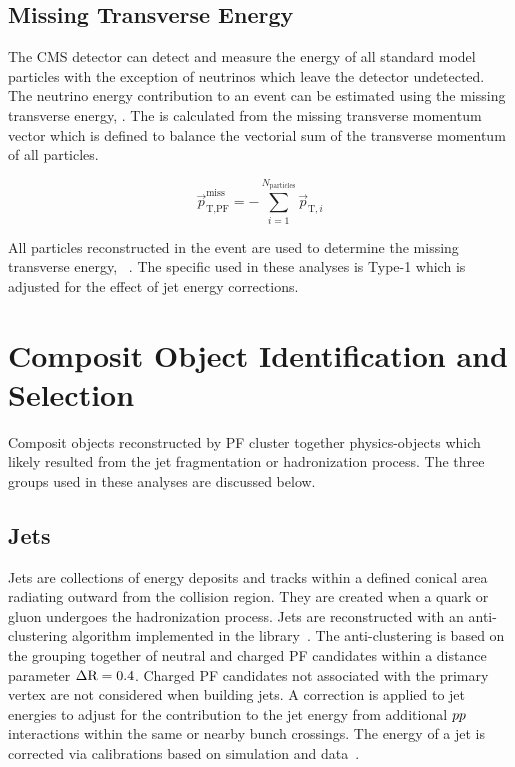 \subsection{Missing Transverse Energy}
The CMS detector can detect and measure the energy of all standard model particles with the exception
of neutrinos which leave the detector undetected. The neutrino energy contribution to an event can
be estimated using the missing transverse energy, \etvecmiss. The \etvecmiss is calculated from
the missing transverse momentum vector which is defined 
to balance the vectorial sum of the transverse momentum of all particles.

\begin{equation}
\vec{p}^{\text{miss}}_{\text{T,PF}} = - \sum^{N_{\text{particles}}}_{i=1} \vec{p}_{\text{T},i}
\end{equation}

All particles reconstructed in the event are used to determine the missing transverse energy,
\etvecmiss~\cite{Khachatryan:2014gga}. The specific \etvecmiss used in these analyses is Type-1
\etvecmiss which is adjusted for the effect of jet energy corrections.


\section{Composit Object Identification and Selection}
Composit objects reconstructed by PF cluster together physics-objects which likely
resulted from the jet fragmentation or hadronization process. The three groups used in these
analyses are discussed below.

 
\subsection{Jets}
Jets are collections of energy deposits and tracks within a defined conical area radiating outward
from the collision region. They are created when a quark or gluon undergoes the hadronization process.
Jets are reconstructed with an anti-\kt clustering algorithm implemented in the \FASTJET 
library~\cite{Cacciari:2008gp, Cacciari:2011ma, Cacciari:fastjet2}. The anti-\kt clustering is based on the grouping
together of neutral and charged PF candidates within a distance parameter $\Delta \mathrm{R} = 0.4$. Charged PF 
candidates not associated with the primary vertex are not considered when building jets.
A correction is applied to jet energies to adjust for the contribution to the jet energy from 
additional $pp$ interactions within the same or nearby bunch crossings. The energy of a jet is 
corrected via calibrations based on simulation and data~\cite{CMS-JME-10-011}.


